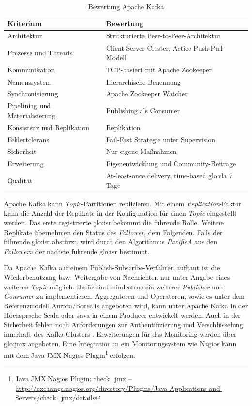 \begin{table}[ht!]
	\centering
		\begin{tabular}{@{}ll@{}} \toprule
			\textbf{Kriterium} & \textbf{Bewertung} \\ \midrule
			Architektur & Strukturierte Peer-to-Peer-Architektur \\
			Prozesse und Threads & Client-Server Cluster, Actice Push-Pull-Modell \\
			Kommunikation & TCP-basiert mit Apache Zookeeper \\
			Namenssystem & Hierarchische Benennung \\
			Synchronisierung & Apache Zookeeper Watcher \\
			Pipelining und Materialisierung & Publishing als Consumer \\
			Konsistenz und Replikation & Replikation \\
			Fehlertoleranz & Fail-Fast Strategie unter Supervision \\ %
			Sicherheit & Nur eigene Maßnahmen \\
			Erweiterung & Eigenentwicklung und Community-Beiträge \\
			Qualität & At-least-once delivery, time-based \gls{glo:sla} 7 Tage \\
			\bottomrule			
		\end{tabular}
	\caption{Bewertung Apache Kafka}
	\label{tab:bewkafka}
\end{table}

Apache Kafka kann \textit{Topic}-Partitionen replizieren. Mit einem \textit{Replication}-Faktor kann die Anzahl der Replikate in der Konfiguration für einen \textit{Topic} eingestellt werden. Das erste registrierte \gls{glo:isr} bekommt die führende Rolle. Weitere Replikate übernehmen den Status des \textit{Follower}, dem Folgenden. Falls der führende \gls{glo:isr} abstürzt, wird durch den Algorithmus \textit{PacificA}  aus den \textit{Followern} der nächste führende \gls{glo:isr} bestimmt. 

Da Apache Kafka auf einem Publish-Subscribe-Verfahren aufbaut ist die Wiederbenutzung bzw. Weitergabe von Nachrichten nur unter Angabe eines weiteren \textit{Topic} möglich. Dafür sind mindestens ein weiterer \textit{Publisher} und \textit{Consumer} zu implementieren. Aggregatoren und Operatoren, sowie es unter dem Referenzmodell Aurora/Borealis angeboten wird, kann unter Apache Kafka in der Hochsprache Scala oder Java in einem Producer entwickelt werden. Auch in der Sicherheit fehlen noch Anforderungen zur Authentifizierung und Verschlüsselung innerhalb des Kafka-Clusters . Erweiterungen für das Monitoring werden über \gls{glo:jmx} angeboten. Eine Integration in ein Monitoringsystem wie Nagios kann mit dem Java JMX Nagios Plugin\footnote{Java JMX Nagios Plugin: check\_jmx -- \url{http://exchange.nagios.org/directory/Plugins/Java-Applications-and-Servers/check\_jmx/details}} erfolgen.


